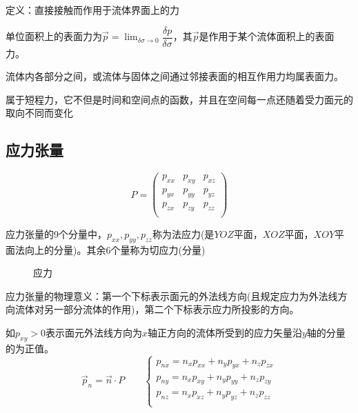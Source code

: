 \documentclass[a4paper,oneside]{ctexbook}
\begin{document}
定义：直接接触而作用于流体界面上的力

单位面积上的表面力为\(\overrightarrow{p}=\lim_{\delta\sigma\to0}\limits\dfrac{\delta{p}}{\delta\sigma}\)，其\(\overrightarrow{p}\)是作用于某个流体面积上的表面力。

流体内各部分之间，或流体与固体之间通过邻接表面的相互作用力均属表面力。

属于短程力，它不但是时间和空间点的函数，并且在空间每一点还随着受力面元的取向不同而变化

\subsection{应力张量}
\begin{equation}
P=\begin{pmatrix}
    p_{xx}&p_{xy}&p_{xz}\\
    p_{yx}&p_{yy}&p_{yz}\\
    p_{zx}&p_{zy}&p_{zz}\\
\end{pmatrix}
\end{equation}

应力张量的9个分量中，\(p_{xx},p_{yy},p_{zz}\)称为法应力(是\(YOZ\)平面，\(XOZ\)平面，\(XOY\)平面法向上的分量)。其余6个量称为切应力(分量)
\begin{figure}[htbp]
    \centering
    \caption{应力}
\end{figure}

应力张量的物理意义：第一个下标表示面元的外法线方向(且规定应力为外法线方向流体对另一部分流体的作用)，第二个下标表示应力所投影的方向。

如\(p_{xy}>0\)表示面元外法线方向为\(x\)轴正方向的流体所受到的应力矢量沿\(y\)轴的分量的为正值。
\begin{equation}
\overrightarrow{p}_n=\overrightarrow{n}\cdot{P}\qquad
\left\{
\begin{array}{c}
    p_{nx}=n_xp_{xx}+n_yp_{yx}+n_zp_{zx}\\
    p_{ny}=n_xp_{xy}+n_yp_{yy}+n_zp_{zy}\\
    p_{nz}=n_xp_{xz}+n_yp_{yz}+n_zp_{zz}\\
\end{array}
\right.
\end{equation}
\end{document}
